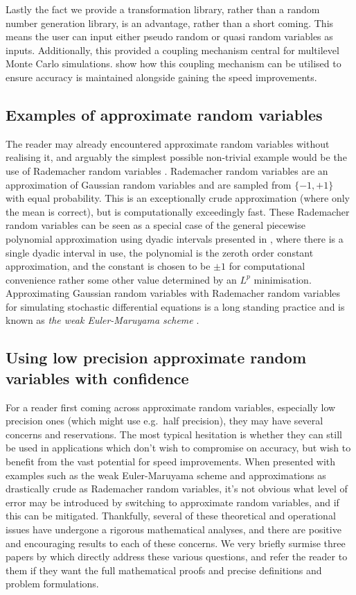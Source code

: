 Lastly the fact we provide a transformation library, rather than a random number generation library, is an advantage, rather than a short coming. This means the user can input either pseudo random or quasi random variables as inputs. Additionally, this provided a coupling mechanism central for multilevel Monte Carlo simulations. \citet{giles2022approximate} show how this coupling mechanism can be utilised to ensure accuracy is maintained alongside gaining the speed improvements. 

\subsection{Examples of approximate random variables}


The reader may already encountered approximate random variables without realising it, and arguably the simplest possible non-trivial example would be the use of Rademacher random variables \citep{todo}. Rademacher random variables are an approximation of Gaussian random variables and are sampled from \( \{-1, +1\} \) with equal probability. This is an exceptionally crude approximation (where only the mean is correct), but is computationally exceedingly fast. These Rademacher random variables can be seen as a special case of the general piecewise polynomial approximation using dyadic intervals presented in \citep{giles2023approximating}, where there is a single dyadic interval in use, the polynomial is the zeroth order constant approximation, and the constant is chosen to be \( \pm 1 \) for computational convenience rather some other value determined by an \( L^p \) minimisation. Approximating Gaussian random variables with Rademacher random variables for simulating stochastic differential equations is a long standing practice and is known as \textit{the weak Euler-Maruyama scheme} \citep[p.\,\mbox{XXXII}]{glasserman2003monte}.

\subsection{Using low precision approximate random variables with confidence}


For a reader first coming across approximate random variables, especially low precision ones (which might use  e.g.\ half precision), they may have several concerns and reservations. The most typical hesitation is whether they can still be used in applications which don't wish to compromise on accuracy, but wish to benefit from the vast potential for speed improvements. When presented with examples such as the weak Euler-Maruyama scheme and approximations as drastically crude as Rademacher random variables, it's not obvious what level of error may be introduced by switching to approximate random variables, and if this can be mitigated. Thankfully, several of these theoretical and operational issues have undergone a rigorous mathematical analyses, and there are positive and encouraging results to each of these concerns. We very briefly surmise three papers by \citeauthor{giles2022approximate} which directly address these various questions, and refer the reader to them if they want the full mathematical proofs and precise definitions and problem formulations. 

